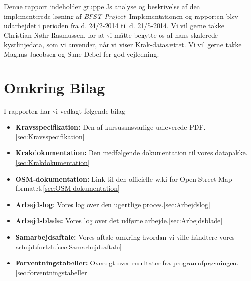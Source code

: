 Denne rapport indeholder gruppe Js analyse og beskrivelse af den implementerede løsning af \emph{BFST Project}. Implementationen og rapporten blev udarbejdet i perioden fra d. 24/2-2014 til d. 21/5-2014.
Vi vil gerne takke Christian Nøhr Rasmussen, for at vi måtte benytte os af hans skalerede kystlinjedata, som vi anvender, når vi viser Krak-datasættet. Vi vil gerne takke Magnus Jacobsen og Sune Debel for god vejledning.

\section{Omkring Bilag}
I rapporten har vi vedlagt følgende bilag:
\begin{itemize}
	\item \textbf{Kravsspecifikation:} Den af kursusansvarlige udleverede PDF.\ref{sec:Kravsspecifikation}
	\item \textbf{Krakdokumentation:} Den medfølgende dokumentation til vores datapakke.\ref{sec:Krakdokumentation}
	\item \textbf{OSM-dokumentation:} Link til den officielle wiki for Open Street Map-formatet.\ref{sec:OSM-dokumentation}
	\item \textbf{Arbejdslog:} Vores log over den ugentlige proces.\ref{sec:Arbejdslog}
	\item \textbf{Arbejdsblade:} Vores log over det udførte arbejde.\ref{sec:Arbejdsblade}
	\item \textbf{Samarbejdsaftale:} Vores aftale omkring hvordan vi ville håndtere vores arbejdsforløb.\ref{sec:Samarbejdsaftale}
	\item \textbf{Forventningstabeller:} Oversigt over resultater fra programafprøvningen.\ref{sec:forventningstabeller}
\end{itemize}

